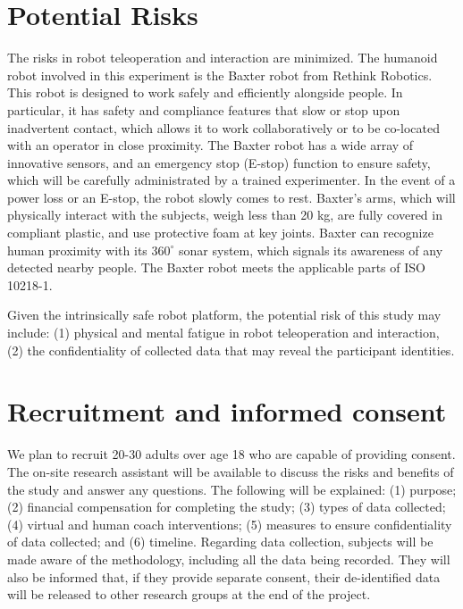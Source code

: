 \section{Potential Risks}\label{sec:risk}
The risks in robot teleoperation and interaction are minimized. The humanoid robot involved in this experiment is the Baxter robot from Rethink Robotics. This robot is designed to work safely and efficiently alongside people. In particular, it has safety and compliance features that slow or stop upon inadvertent contact, which allows it to work collaboratively or to be co-located with an operator in close proximity. The Baxter robot has a wide array of innovative sensors, and an emergency stop (E-stop) function to ensure safety, which will be carefully administrated by a trained experimenter. In the event of a power loss or an E-stop, the robot slowly comes to rest. Baxter’s arms, which will physically interact with the subjects, weigh less than 20 kg, are fully covered in compliant plastic, and use protective foam at key joints. Baxter can recognize human proximity with its $360^\circ$ sonar system, which signals its awareness of any detected nearby people. The Baxter robot meets the applicable parts of ISO 10218-1. 

Given the intrinsically safe robot platform, the potential risk of this study may include: (1) physical and mental fatigue in robot teleoperation and interaction, (2) the confidentiality of collected data that may reveal the participant identities. 

\section{Recruitment and informed consent}\label{sec:consent}
We plan to recruit 20-30 adults over age 18 who are capable of providing consent. The on-site research assistant will be available to discuss the risks and benefits of the study and answer any questions. The following will be explained: (1) purpose; (2) financial compensation for completing the study; (3) types of data collected; (4) virtual and human coach interventions; (5) measures to ensure confidentiality of data collected; and (6) timeline. Regarding data collection, subjects will be made aware of the methodology, including all the data being recorded. They will also be informed that, if they provide separate consent, their de-identified data will be released to other research groups at the end of the project.


